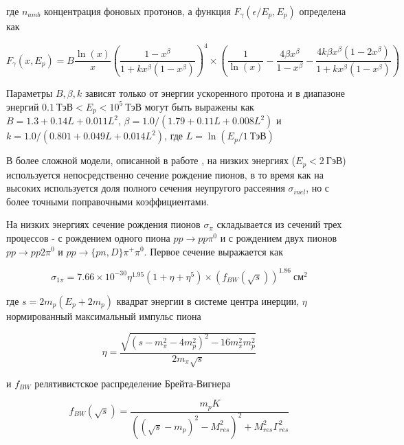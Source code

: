 где $n_{amb}$ концентрация фоновых протонов, а функция $F_{\gamma}(\epsilon/E_p, E_p)$ определена как

\begin{equation}
	F_{\gamma}(x, E_p) = B \frac{\ln(x)}{x} \left(\frac{1-x^\beta}{1+k x^{\beta}\left(1-x^\beta\right)}\right)^4\times\left(\frac{1}{\ln(x)}-\frac{4\beta x^\beta}{1-x^\beta}-\frac{4 k\beta x^\beta\left(1-2x^\beta\right)}{1+k x^\beta\left(1-x^\beta\right)}\right)
\end{equation}

Параметры $B, \beta, k$ зависят только от энергии ускоренного протона и в диапазоне энергий $0.1~\text{ТэВ} < E_p < 10^5~\text{ТэВ}$ могут быть выражены как $B = 1.3 + 0.14 L + 0.011 L^2$, $\beta = 1.0/\left(1.79 + 0.11 L  + 0.008 L^2\right)$ и $k = 1.0/\left(0.801 + 0.049 L + 0.014 L^2\right)$, где $L = \ln\left(E_p/1~\text{ТэВ}\right)$

В более сложной модели, описанной в работе \cite{Kafexhiu}, на низких энергиях ($E_p < 2~\text{ГэВ}$) используется непосредственно сечение рождение пионов, в то время как на высоких используется доля полного сечения неупругого рассеяния $\sigma_{inel}$, но с более точными поправочными коэффициентами.

На низких энергиях сечение рождения пионов  $\sigma_{\pi}$ складывается из сечений трех процессов - с рождением одного пиона $pp\rightarrow pp\pi^0$ и с рождением двух пионов $pp\rightarrow pp2\pi^0$ и $pp\rightarrow \{pn,D\}\pi^{+}\pi^0$. Первое сечение выражается как

\begin{equation}
	\sigma_{1\pi} = 7.66\times10^{-30}\eta^{1.95}\left(1 + \eta + \eta^5\right)\times\left(f_{BW}\left(\sqrt s\right)\right)^{1.86}~\text{см}^{2}
\end{equation}

где $s = 2 m_p \left(E_p+2m_p\right)$ квадрат энергии в системе центра инерции, $\eta$ нормированный максимальный импульс пиона

\begin{equation}
	\eta = \frac{\sqrt{\left(s-m_{\pi}^2-4m_p^2\right)^2-16 m_{\pi}^2m_p^2}}{2m_{\pi}\sqrt{s}}
\end{equation}

и $f_{BW}$ релятивистское распределение Брейта-Вигнера

\begin{equation}
	f_{BW}\left(\sqrt{s}\right)=\frac{m_p K}{\left(\left(\sqrt{s}-m_p\right)^2-M_{res}^2\right)^2+M_{res}^2\Gamma_{res}^2}
\end{equation}

